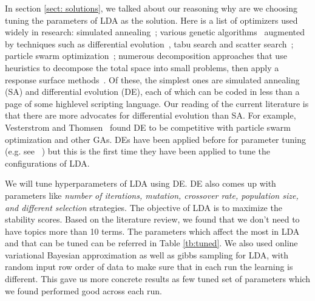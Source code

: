 \documentclass[conference]{IEEEtran}
\theoremstyle{break}
\begin{document}
In section \ref{sect: solutions}, we talked about our reasoning why are we choosing tuning the parameters of LDA as the solution. Here is a list of optimizers used widely in research: simulated annealing~\cite{feather2002converging, menzies2007business}; various genetic algorithms~\cite{goldberg1979complexity} augmented by techniques such as differential evolution~\cite{storn1997differential}, tabu search and scatter search~\cite{glover1986general, beausoleil2006moss, molina2007sspmo, nebro2008abyss}; particle swarm optimization~\cite{pan2008particle}; numerous decomposition approaches that use heuristics to decompose the total space into small problems, then apply a response surface methods~\cite{krall2015gale, zuluaga2013active}. Of these, the simplest ones are simulated annealing (SA) and differential evolution (DE), each of which can be coded in less than a page of some highlevel scripting language. Our reading of the current literature is that there are more advocates for differential evolution than SA. For example, Vesterstrom and Thomsen~\cite{vesterstrom2004comparative} found DE to be competitive with particle swarm optimization and other GAs. DEs have been applied before for parameter tuning (e.g. see~\cite{omran2005differential, chiha2012tuning, fu2016tuning} ) but this is the first time they have been applied to tune the configurations of LDA.

We will tune hyperparameters of LDA using DE. DE also comes up with parameters like \textit{number of iterations, mutation, crossover rate, population size, and different selection} strategies. The objective of LDA is to maximize the stability scores. Based on the literature review, we found that we don't need to have topics more than 10 terms. The parameters which affect the most in LDA and that can be tuned can be referred in Table \ref{tb:tuned}. We also used online variational Bayesian approximation as well as gibbs sampling for LDA, with random input row order of data to make sure that in each run the learning is different. This gave us more concrete results as few tuned set of parameters which we found performed good across each run.
\end{document}
